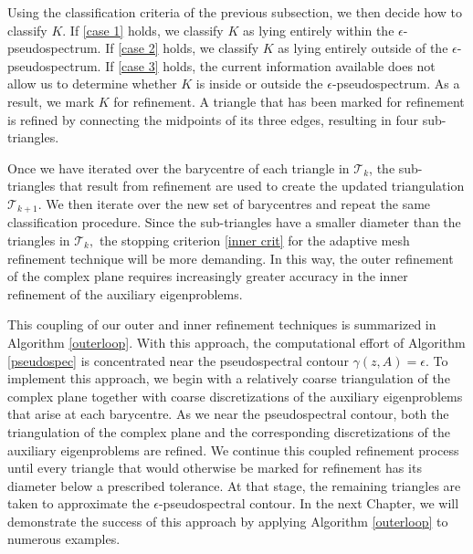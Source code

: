 Using the classification criteria of the previous subsection, we then decide how to classify $K.$ If \eqref{case 1} holds, we classify $K$ as lying entirely within the $\epsilon$-pseudospectrum. If \eqref{case 2} holds, we classify $K$ as lying entirely outside of the $\epsilon$-pseudospectrum. If \eqref{case 3} holds, the current information available does not allow us to determine whether $K$ is inside or outside the $\epsilon$-pseudospectrum. As a result, we mark $K$ for refinement. A triangle that has been marked for refinement is refined by connecting the midpoints of its three edges, resulting in four sub-triangles. 

Once we have iterated over the barycentre of each triangle in $\mathcal{T}_k$, the sub-triangles that result from refinement are used to create the updated triangulation $\mathcal{T}_{k+1}.$ We then iterate over the new set of barycentres and repeat the same classification procedure. Since the sub-triangles have a smaller diameter than the triangles in $\mathcal{T}_k,$ the stopping criterion \eqref{inner crit} for the adaptive mesh refinement technique will be more demanding. In this way, the outer refinement of the complex plane requires increasingly greater accuracy in the inner refinement of the auxiliary eigenproblems. 

This coupling of our outer and inner refinement techniques is summarized in Algorithm \ref{outerloop}. With this approach, the computational effort of Algorithm \ref{pseudospec} is concentrated near the pseudospectral contour $\gamma(z, A) = \epsilon.$ To implement this approach, we begin with a relatively coarse triangulation of the complex plane together with coarse discretizations of the auxiliary eigenproblems that arise at each barycentre. As we near the pseudospectral contour, both the triangulation of the complex plane and the corresponding discretizations of the auxiliary eigenproblems are refined. We continue this coupled refinement process until every triangle that would otherwise be marked for refinement has its diameter below a prescribed tolerance. At that stage, the remaining triangles are taken to approximate the $\epsilon$-pseudospectral contour. In the next Chapter, we will demonstrate the success of this approach by applying Algorithm \ref{outerloop} to numerous examples.



